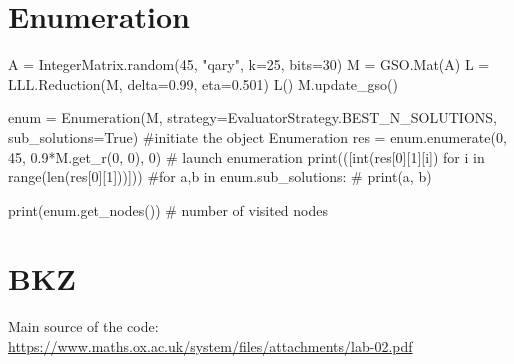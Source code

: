 \documentclass[11pt]{exam}
\theoremstyle{definition}
\begin{document}
\section{Enumeration}

\begin{python}
	A = IntegerMatrix.random(45, "qary", k=25, bits=30)
	M = GSO.Mat(A)
	L = LLL.Reduction(M, delta=0.99, eta=0.501)
	L()
	M.update_gso()
	
	enum = Enumeration(M, strategy=EvaluatorStrategy.BEST_N_SOLUTIONS, sub_solutions=True) #initiate the object Enumeration
	res = enum.enumerate(0, 45, 0.9*M.get_r(0, 0), 0) # launch enumeration
	print(([int(res[0][1][i]) for i in range(len(res[0][1]))]))
	#for a,b in enum.sub_solutions:
	#    print(a, b)
	
	print(enum.get_nodes()) # number of visited nodes
\end{python}

\section{BKZ}

Main source of the code: \url{https://www.maths.ox.ac.uk/system/files/attachments/lab-02.pdf}
\end{document}
